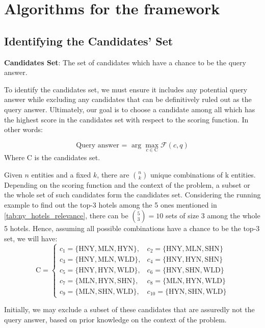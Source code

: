 \section{Algorithms for the framework}
\label{section3}

\subsection{Identifying the Candidates' Set}
\label{candidatesset}

\begin{definition}
    \textbf{Candidates Set}: The set of candidates which have a chance to be the query answer.
\end{definition}
 To identify the candidates set, we must ensure it includes any potential query answer while excluding any candidates that can be definitively ruled out as the query answer.
 Ultimately, our goal is to choose a candidate among all which has the highest score in the candidates set with respect to the scoring function. In other words:

\[
\text{Query answer = } \arg\max_{c \in \text{C}} \mathcal{F}(c, q)
\]
Where \(\text{C}\) is the candidates set.

\begin{example}
    Given $n$ entities and a fixed $k$, there are \( \binom{n}{k} \) unique combinations of k entities. Depending on the scoring function and the context of the problem, a subset or the whole set of such candidates form the candidates set. Considering the running example to find out the top-3 hotels among the 5 ones mentioned in \autoref{tab:ny_hotels_relevance}, there can be \( \binom{5}{3} = 10 \) sets of size 3 among the whole 5 hotels. Hence, assuming all possible combinations have a chance to be the top-3 set, we will have:
    \[
    \text{C} = 
    \begin{cases}
    c_1 = \{ \text{HNY}, \text{MLN}, \text{HYN} \}, & c_2 = \{ \text{HNY}, \text{MLN}, \text{SHN} \} \\
    c_3 = \{ \text{HNY}, \text{MLN}, \text{WLD} \}, & c_4 = \{ \text{HNY}, \text{HYN}, \text{SHN} \} \\
    c_5 = \{ \text{HNY}, \text{HYN}, \text{WLD} \}, & c_6 = \{ \text{HNY}, \text{SHN}, \text{WLD} \} \\
    c_7 = \{ \text{MLN}, \text{HYN}, \text{SHN} \}, & c_8 = \{ \text{MLN}, \text{HYN}, \text{WLD} \} \\
    c_9 = \{ \text{MLN}, \text{SHN}, \text{WLD} \}, & c_{10} = \{ \text{HYN}, \text{SHN}, \text{WLD} \} 
    \end{cases}
\]

Initially, we may exclude a subset of these candidates that are assuredly not the query answer, based on prior knowledge on the context of the problem. 

\end{example}


